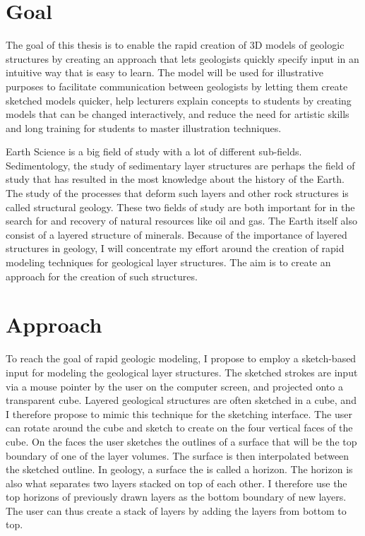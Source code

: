 \documentclass[a4paper,12pt]{report}
\begin{document}
\section{Goal}
The goal of this thesis is to enable the rapid creation of 3D models of geologic structures by creating an approach that lets geologists quickly specify input in an intuitive way that is easy to learn. The model will be used for illustrative purposes to facilitate communication between geologists by letting them create sketched models quicker, help lecturers explain concepts to students by creating models that can be changed interactively, and reduce the need for artistic skills and long training for students to master illustration techniques.

Earth Science is a big field of study with a lot of different sub-fields. Sedimentology, the study of sedimentary layer structures are perhaps the field of study that has resulted in the most knowledge about the history of the Earth. The study of the processes that deform such layers and other rock structures is called structural geology. These two fields of study are both important for in the search for and recovery of natural resources like oil and gas. The Earth itself also consist of a layered structure of minerals. Because of the importance of layered structures in geology, I will concentrate my effort around the creation of rapid modeling techniques for geological layer structures. The aim is to create an approach for the creation of such structures.

\section{Approach}
To reach the goal of rapid geologic modeling, I propose to employ a sketch-based input for modeling the geological layer structures. The sketched strokes are input via a mouse pointer by the user on the computer screen, and projected onto a transparent cube. Layered geological structures are often sketched in a cube, and I therefore propose to mimic this technique for the sketching interface. The user can rotate around the cube and sketch to create  on the four vertical faces of the cube. On the faces the user sketches the outlines of a surface that will be the top boundary of one of the layer volumes. The surface is then interpolated between the sketched outline. In geology, a surface the is called a horizon. The horizon is also what separates two layers stacked on top of each other. I therefore use the top horizons of previously drawn layers as the bottom boundary of new layers. The user can thus create a stack of layers by adding the layers from bottom to top.
\end{document}
